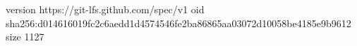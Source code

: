 version https://git-lfs.github.com/spec/v1
oid sha256:d014616019fc2c6aedd1d4574546fe2ba86865aa03072d10058be4185e9b9612
size 1127
